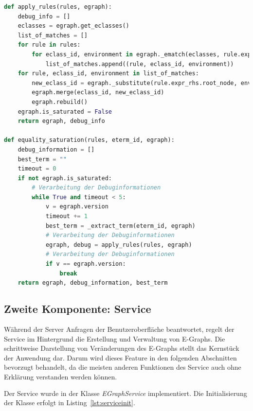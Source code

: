 \begin{lstlisting}[language=Python, caption=Auszug aus der Klasse \textit{EGraph}, label={lst:methods3}]
def apply_rules(rules, egraph):
    debug_info = []
    eclasses = egraph.get_eclasses()
    list_of_matches = []
    for rule in rules:
        for eclass_id, environment in egraph._ematch(eclasses, rule.expr_lhs.root_node):
            list_of_matches.append((rule, eclass_id, environment))
    for rule, eclass_id, environment in list_of_matches:
        new_eclass_id = egraph._substitute(rule.expr_rhs.root_node, environment)
        egraph.merge(eclass_id, new_eclass_id)
        egraph.rebuild()
    egraph.is_saturated = False
    return egraph, debug_info

def equality_saturation(rules, eterm_id, egraph):
    debug_information = []
    best_term = ""
    timeout = 0
    if not egraph.is_saturated:
        # Verarbeitung der Debuginformationen
        while True and timeout < 5:
            v = egraph.version
            timeout += 1
            best_term = _extract_term(eterm_id, egraph)
            # Verarbeitung der Debuginformationen
            egraph, debug = apply_rules(rules, egraph)
            # Verarbeitung der Debuginformationen
            if v == egraph.version:
                break
    return egraph, debug_information, best_term
\end{lstlisting} 




















\subsection{Zweite Komponente: Service}

Während der Server Anfragen der Benutzeroberfläche beantwortet, regelt der Service im Hintergrund die Erstellung und Verwaltung von E-Graphs.
Die schrittweise Darstellung von Veränderungen des E-Graphs stellt das Kernstück der Anwendung dar. Darum wird dieses Feature in den folgenden Abschnitten bevorzugt behandelt,
da die meisten anderen Funktionen des Service auch ohne Erklärung verstanden werden können.

Der Service wurde in der Klasse \textit{EGraphService} implementiert. Die Initialisierung der Klasse erfolgt in Listing~\ref{lst:serviceinit}.

